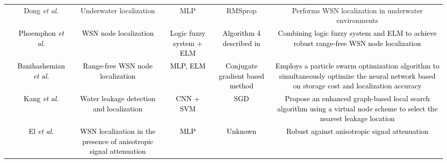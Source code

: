 \documentclass[journal,comsoc,letter]{IEEEtran}
\newcommand{\rev}[1]{\textcolor{black}{#1}}
\begin{document}
\begin{table*}[h!]
\begin{tabular}{|c|C{2CM}|C{3CM}|C{1.5CM}|C{2CM}|C{3.8CM}|}
                                                     & Dong \emph{et al.} \cite{dong2017range}                      & Underwater localization                                                                                & MLP                                          & RMSprop                                                       & Performs WSN localization in underwater environments                                                                                                \\  
                                                     & \rev{Phoemphon \emph{et al.} \cite{phoemphon2018hybrid}}      & \rev{WSN node localization}                                                                             & \rev{Logic fuzzy system + ELM}                & \rev{Algorithm 4 described in \cite{phoemphon2018hybrid}}      & \rev{Combining logic fuzzy system and ELM to achieve robust range-free WSN node localization}                                                        \\  
                                                     & \rev{Banihashemian \emph{et al.} \cite{banihashemian2018new}} & \rev{Range-free WSN node localization}                                                                  & \rev{MLP, ELM}                                & \rev{Conjugate gradient based method }                         & \rev{Employs a particle swarm optimization algorithm to simultaneously optimize the neural network based on storage cost and localization accuracy} \\  
                                                     & \rev{Kang \emph{et al.} \cite{kang2018novel}}                 & \rev{Water leakage detection and localization}                                                          & \rev{CNN + SVM}                               & \rev{SGD}                                                      & \rev{Propose an enhanced graph-based local search algorithm using a virtual node scheme to select the nearest leakage location}            \\  
                                                     & \rev{El \emph{et al.} \cite{el2016robust}}                    & \rev{WSN localization in the presence of anisotropic signal attenuation}                                & \rev{MLP}                                     & \rev{Unknown}                                                  & \rev{Robust against anisotropic signal attenuation}                                                                                              \\ \hline

\end{tabular}
\end{table*}
\end{document}
